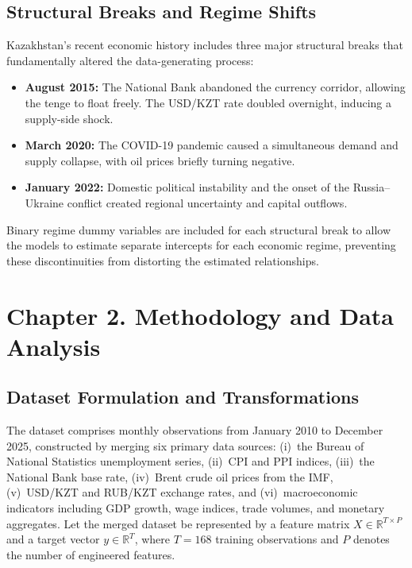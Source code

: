 \documentclass[14pt, a4paper]{extarticle}
\begin{document}
\subsection{Structural Breaks and Regime Shifts}
Kazakhstan's recent economic history includes three major structural breaks that fundamentally altered the data-generating process:
\begin{itemize}[nosep]
    \item \textbf{August 2015:} The National Bank abandoned the currency corridor, allowing the tenge to float freely. The USD/KZT rate doubled overnight, inducing a supply-side shock.
    \item \textbf{March 2020:} The COVID-19 pandemic caused a simultaneous demand and supply collapse, with oil prices briefly turning negative.
    \item \textbf{January 2022:} Domestic political instability and the onset of the Russia--Ukraine conflict created regional uncertainty and capital outflows.
\end{itemize}
Binary regime dummy variables are included for each structural break to allow the models to estimate separate intercepts for each economic regime, preventing these discontinuities from distorting the estimated relationships.

\newpage
\section{Chapter 2. Methodology and Data Analysis}

\subsection{Dataset Formulation and Transformations}
The dataset comprises monthly observations from January 2010 to December 2025, constructed by merging six primary data sources: (i)~the Bureau of National Statistics unemployment series, (ii)~CPI and PPI indices, (iii)~the National Bank base rate, (iv)~Brent crude oil prices from the IMF, (v)~USD/KZT and RUB/KZT exchange rates, and (vi)~macroeconomic indicators including GDP growth, wage indices, trade volumes, and monetary aggregates. Let the merged dataset be represented by a feature matrix $X \in \mathbb{R}^{T \times P}$ and a target vector $y \in \mathbb{R}^T$, where $T = 168$ training observations and $P$ denotes the number of engineered features.
\end{document}
